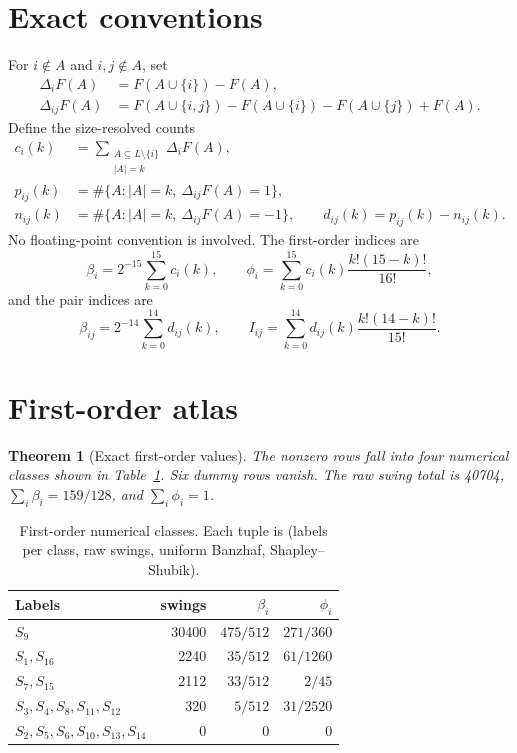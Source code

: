 \documentclass[10pt]{article}
\newtheorem{theorem}{Theorem}
\newcommand{\cF}{F}
\newcommand{\cL}{L}
\begin{document}
\section{Exact conventions}
For $i\notin A$ and $i,j\notin A$, set
\begin{align*}
 \Delta_i\cF(A)&=\cF(A\cup\{i\})-\cF(A),\\
 \Delta_{ij}\cF(A)&=\cF(A\cup\{i,j\})-\cF(A\cup\{i\})
 -\cF(A\cup\{j\})+\cF(A).
\end{align*}
Define the size-resolved counts
\begin{align*}
 c_i(k)&=\sum_{\substack{A\subseteq\cL\setminus\{i\}\\|A|=k}}
 \Delta_i\cF(A),\\
 p_{ij}(k)&=\#\{A:|A|=k,\ \Delta_{ij}\cF(A)=1\},\\
 n_{ij}(k)&=\#\{A:|A|=k,\ \Delta_{ij}\cF(A)=-1\},\qquad
 d_{ij}(k)=p_{ij}(k)-n_{ij}(k).
\end{align*}
No floating-point convention is involved.  The first-order indices are
\[
 \beta_i=2^{-15}\sum_{k=0}^{15}c_i(k),\qquad
 \phi_i=\sum_{k=0}^{15}c_i(k)\frac{k!(15-k)!}{16!},
 \tag{2}
\]
and the pair indices are
\[
 \beta_{ij}=2^{-14}\sum_{k=0}^{14}d_{ij}(k),\qquad
 I_{ij}=\sum_{k=0}^{14}d_{ij}(k)\frac{k!(14-k)!}{15!}.
 \tag{3}
\]

\section{First-order atlas}
\begin{theorem}[Exact first-order values]
The nonzero rows fall into four numerical classes shown in
Table~\ref{tab:first}.  Six dummy rows vanish.  The raw swing total is 40704,
$\sum_i\beta_i=159/128$, and $\sum_i\phi_i=1$.
\end{theorem}

\begin{table}[h]
\centering
\caption{First-order numerical classes.  Each tuple is (labels per class,
raw swings, uniform Banzhaf, Shapley--Shubik).}
\label{tab:first}
\begin{tabular}{@{}lrrr@{}}
\toprule
Labels & swings & $\beta_i$ & $\phi_i$\\
\midrule
$S_9$ & 30400 & $475/512$ & $271/360$\\
$S_1,S_{16}$ & 2240 & $35/512$ & $61/1260$\\
$S_7,S_{15}$ & 2112 & $33/512$ & $2/45$\\
$S_3,S_4,S_8,S_{11},S_{12}$ & 320 & $5/512$ & $31/2520$\\
$S_2,S_5,S_6,S_{10},S_{13},S_{14}$ & 0 & 0 & 0\\
\bottomrule
\end{tabular}
\end{table}
\end{document}
